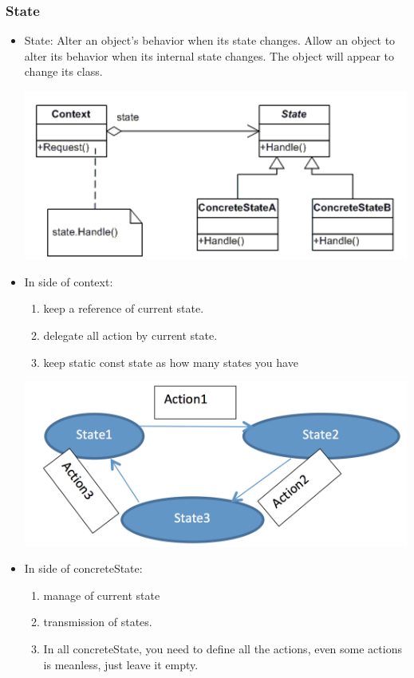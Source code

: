 \documentclass[a4paper,12pt,twoside]{book}
\begin{document}
\subsubsection{State}
\begin{itemize}
\item State: Alter an object's behavior when its state changes. Allow an object to alter its behavior when its internal state changes. The object will appear to change its class.

\includegraphics[scale=0.8]{pics/state.png}

\item In side of context:
\begin{enumerate}
\item keep a reference of current state.
\item delegate all action by current state. 
\item keep static const state as how many states you have
\end{enumerate}

\includegraphics[scale=0.5]{pics/statechange.png}

\item In side of concreteState:

\begin{enumerate}
\item manage of current state
\item transmission of states.
\item In all concreteState, you need to define all the actions, even some actions is meanless, just leave it empty. 
\end{enumerate}

\end{itemize}
\end{document}
